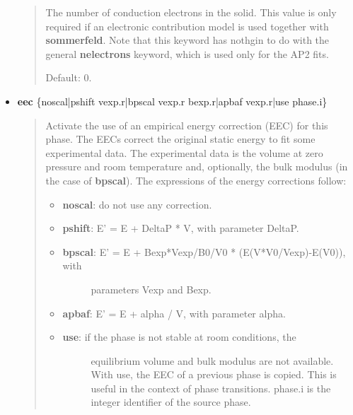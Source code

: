 \documentclass[a4paper]{article}
\begin{document}
\begin{itemize}
\begin{quote}
The number of conduction electrons in the solid. This value is only
required if an electronic contribution model is used together with
\textbf{sommerfeld}. Note that this keyword has nothgin to do with the
general \textbf{nelectrons} keyword, which is used only for the AP2
fits.

Default: 0.

\end{quote}

\item \textbf{eec} \{noscal|pshift vexp.r|bpscal vexp.r bexp.r|apbaf vexp.r|use phase.i\}
%
\begin{quote}

Activate the use of an empirical energy correction (EEC) for this
phase. The EECs correct the original static energy to fit some
experimental data. The experimental data is the volume at zero
pressure and room temperature and, optionally, the bulk modulus (in the
case of \textbf{bpscal}). The expressions of the energy corrections
follow:
%
\begin{itemize}

\item \textbf{noscal}: do not use any correction.

\item \textbf{pshift}: E' = E + DeltaP * V, with parameter DeltaP.

\item %
\begin{description}
\item[{\textbf{bpscal}: E' = E + Bexp*Vexp/B0/V0 * (E(V*V0/Vexp)-E(V0)), with}] \leavevmode 
parameters Vexp and Bexp.

\end{description}

\item \textbf{apbaf}: E' = E + alpha / V, with parameter alpha.

\item %
\begin{description}
\item[{\textbf{use}: if the phase is not stable at room conditions, the}] \leavevmode 
equilibrium volume and bulk modulus are not available. With
use, the EEC of a previous phase is copied. This is useful in
the context of phase transitions. phase.i is the integer
identifier of the source phase.

\end{description}

\end{itemize}


\end{quote}
\end{itemize}
\end{document}
